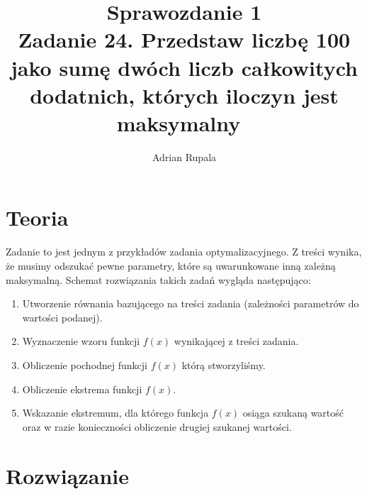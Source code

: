 \documentclass[UTF8]{article}
\title{%
	Sprawozdanie 1 \\
	\large Zadanie 24. Przedstaw liczbę 100 jako sumę dwóch liczb całkowitych dodatnich, których iloczyn jest maksymalny~}
\author{Adrian Rupala}
\begin{document}
\maketitle

\newpage
\tableofcontents

\newpage
{}

\section{Teoria}

Zadanie to jest jednym z przykładów zadania optymalizacyjnego. Z treści wynika, że musimy odszukać pewne parametry, które są uwarunkowane inną zależną maksymalną. Schemat rozwiązania takich zadań wygląda następująco: ~
\begin{enumerate}
	\item Utworzenie równania bazującego na treści zadania (zależności parametrów do wartości podanej).
	\item Wyznaczenie wzoru funkcji $f(x)$ wynikającej z treści zadania. ~
	\item Obliczenie pochodnej funkcji $f(x)$  którą stworzyliśmy. ~
	\item Obliczenie ekstrema funkcji $f(x)$. ~
	\item Wskazanie ekstremum, dla którego funkcja $f(x)$ osiąga szukaną wartość oraz w razie konieczności obliczenie drugiej szukanej wartości.~
\end{enumerate}

\section{Rozwiązanie}
\end{document}
